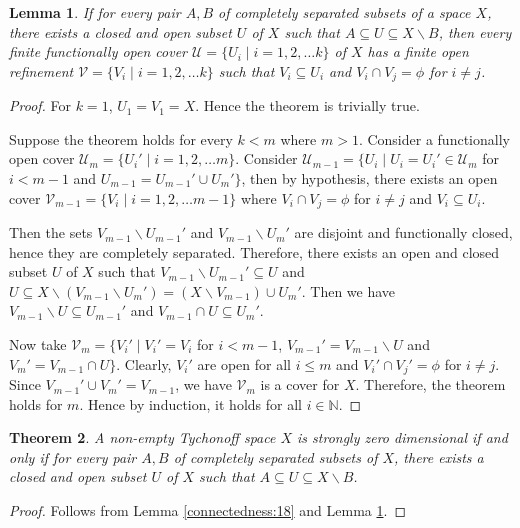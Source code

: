 \documentclass[12pt,oneside,english]{amsbook}
\numberwithin{equation}{section} %
\numberwithin{figure}{section} %
\theoremstyle{plain}
\numberwithin{section}{chapter}
\newtheorem{thm}{Theorem}[section]
\theoremstyle{plain}
\newtheorem{lem}[thm]{Lemma}
\begin{document}
\begin{lem}\label{connectedness:20}
  If for every pair $A,B$ of completely separated subsets of a space $X$, there exists a closed and open subset $U$ of $X$ such that $A \subseteq U \subseteq X \backslash B$, then every finite functionally open cover $\mathcal{U} = \{U_i \; | \; i = 1, 2, \ldots k\}$ of $X$ has a finite open refinement $\mathcal{V} = \{V_i \; | \; i = 1, 2, \ldots k\}$ such that $V_i \subseteq U_i$ and $V_i \cap V_j = \phi$ for $i \neq j$.
\end{lem}
\begin{proof}
  For $k = 1$, $U_1 = V_1 = X$. Hence the theorem is trivially true.

  Suppose the theorem holds for every $k < m$ where $m > 1$. Consider a functionally open cover $\mathcal{U}_m = \{ U_i' \; | \; i = 1, 2, \ldots m\}$. Consider $\mathcal{U}_{m -1} = \{ U_i \; | \; U_i = U_i' \in \mathcal{U}_m$ for $i < m -1$ and $U_{m -1} = U_{m - 1}' \cup U_m' \}$, then by hypothesis, there exists an open cover $\mathcal{V}_{m-1} = \{ V_i \; | \; i = 1, 2, \ldots m-1\}$ where $V_i \cap V_j = \phi$ for $i \neq j$ and $V_i \subseteq U_i$.

  Then the sets $V_{m -1} \backslash U_{m - 1}'$ and $V_{m - 1} \backslash U_{m}'$ are disjoint and functionally closed, hence they are completely separated. Therefore, there exists an open and closed subset $U$ of $X$ such that $V_{m -1} \backslash U_{m - 1}' \subseteq U$ and $U \subseteq X \backslash (V_{m - 1} \backslash U_{m}') = (X \backslash V_{m -1}) \cup U_m'$. Then we have $V_{m - 1} \backslash U \subseteq U_{m - 1}'$ and $V_{m - 1} \cap U \subseteq U_m'$.

  Now take $\mathcal{V}_m = \{ V_i' \; | \; V_i' = V_i $ for $i < m - 1$, $V_{m - 1}' = V_{m - 1} \backslash U$ and $V_m' = V_{m - 1} \cap U \}$. Clearly, $V_i'$ are open for all $i \leq m$ and $V_i' \cap V_j' = \phi$ for $i \neq j$. Since $V_{m - 1}' \cup V_{m}' = V_{m - 1}$, we have $\mathcal{V}_{m}$ is a cover for $X$. Therefore, the theorem holds for $m$. Hence by induction, it holds for all $i \in \mathbb{N}$.
\end{proof}

\begin{thm}\label{connectedness:21}
  A non-empty Tychonoff space $X$ is strongly zero dimensional if and only if for every pair $A,B$ of completely separated subsets of $X$, there exists a closed and open subset $U$ of $X$ such that $A \subseteq U \subseteq X \backslash B$.
\end{thm}
\begin{proof}
  Follows from Lemma \ref{connectedness:18} and Lemma \ref{connectedness:20}.
\end{proof}
\end{document}
